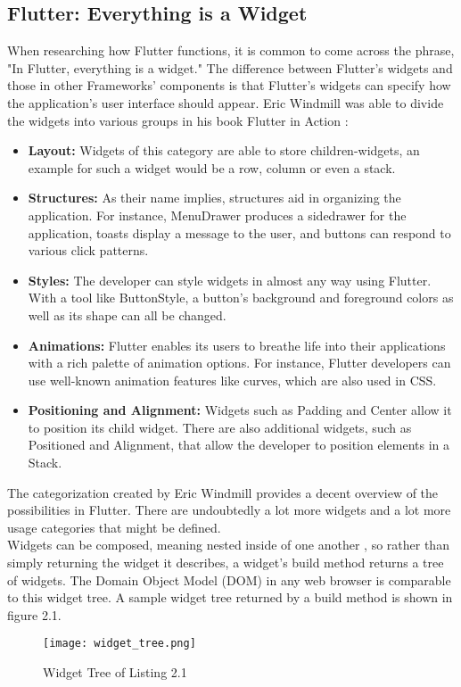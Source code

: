 \subsection{Flutter: Everything is a Widget}
When researching how Flutter functions, it is common to come across the phrase, "In Flutter, everything is a widget." The difference between Flutter's widgets and those in other Frameworks' components is that Flutter's widgets can specify how the application's user interface should appear. Eric Windmill was able to divide the widgets into various groups in his book Flutter in Action \cite[p. 58]{.flutterinaction}:

\begin{itemize}
	\item \textbf{Layout:} 
	Widgets of this category are able to store children-widgets, an example for such a widget would be a row, column or even a stack.  
	\item \textbf{Structures:} 
	As their name implies, structures aid in organizing the application.
	For instance, MenuDrawer produces a sidedrawer for the application, toasts display a message to the user, and buttons can respond to various click patterns. 
	\item \textbf{Styles:} 
	The developer can style widgets in almost any way using Flutter. With a tool like ButtonStyle, a button's background and foreground colors as well as its shape can all be changed.
	\item \textbf{Animations:} 
	Flutter enables its users to breathe life into their applications with a rich palette of animation options. For instance, Flutter developers can use well-known animation features like curves, which are also used in CSS. 
	\item \textbf{Positioning and Alignment:} 
	Widgets such as Padding and Center allow it to position its child widget. There are also additional widgets, such as Positioned and Alignment, that allow the developer to position elements in a Stack.
\end{itemize}
\noindent 
The categorization created by Eric Windmill provides a decent overview of the possibilities in Flutter. There are undoubtedly a lot more widgets and a lot more usage categories that might be defined.
\newline \\
Widgets can be composed, meaning nested inside of one another \cite[p. 61]{.flutterinaction}, so rather than simply returning the widget it describes, a widget's build method returns a tree of widgets. The Domain Object Model (DOM) in any web browser is comparable to this widget tree. A sample widget tree returned by a build method is shown in figure 2.1.
\begin{figure}[H]
	\centering
	\texttt{[image: widget\_tree.png]}
	\caption[Widget Tree of Listing 2.1]{Widget Tree of Listing 2.1}
\end{figure}
